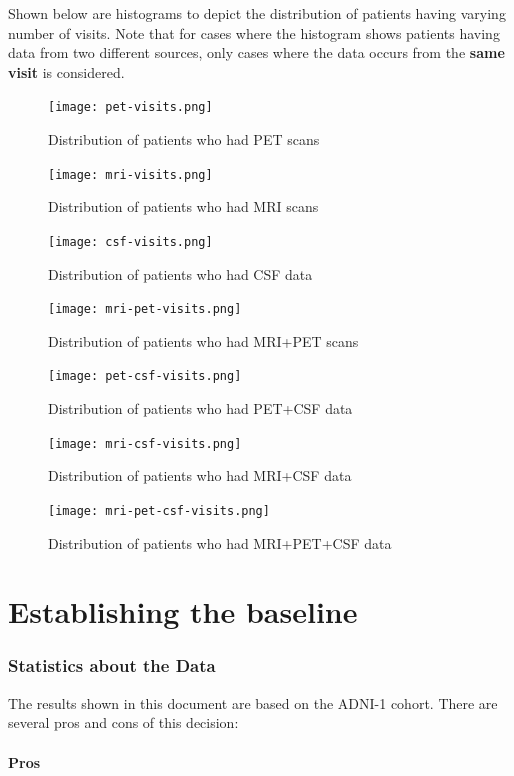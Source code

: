\documentclass[12pt,a4paper]{article}
\begin{document}
Shown below are histograms to depict the distribution of patients
having varying number of visits. Note that for cases where the
histogram shows patients having data from two different sources, only
cases where the data occurs from the \textbf{same visit} is
considered.

\begin{figure}[H]
  \centering
  \texttt{[image: pet-visits.png]}
  \caption{Distribution of patients who had PET scans}
\end{figure}
\begin{figure}[H]
  \texttt{[image: mri-visits.png]}
  \caption{Distribution of patients who had MRI scans}
\end{figure}
\begin{figure}[H]
  \centering
  \texttt{[image: csf-visits.png]}
  \caption{Distribution of patients who had CSF data}
\end{figure}
\begin{figure}[H]
  \texttt{[image: mri-pet-visits.png]}
  \caption{Distribution of patients who had MRI+PET scans}
\end{figure}
\begin{figure}[H]
  \centering
  \texttt{[image: pet-csf-visits.png]}
  \caption{Distribution of patients who had PET+CSF data}
\end{figure}
\begin{figure}[H]
  \texttt{[image: mri-csf-visits.png]}
  \caption{Distribution of patients who had MRI+CSF data}
\end{figure}
\begin{figure}[H]
  \texttt{[image: mri-pet-csf-visits.png]}
  \caption{Distribution of patients who had MRI+PET+CSF data}
\end{figure}

\part{Establishing the baseline}

\section{Statistics about the Data}
\label{sec:stats}

The results shown in this document are based on the ADNI-1
cohort. There are several pros and cons of this decision:

\subsection{Pros}
\end{document}
